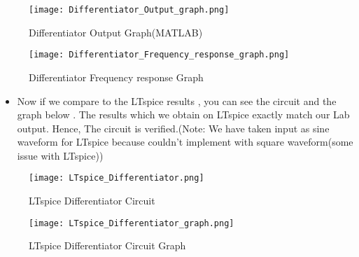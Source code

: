 \documentclass[9pt,conference]{IEEEtran}
\begin{document}
\begin{figure}[H]
    \centering
    \texttt{[image: Differentiator\_Output\_graph.png]}
    \caption{Differentiator Output Graph(MATLAB)}
    \label{fig:positive_clamper}
\end{figure}
\begin{figure}[H]
    \centering
    \texttt{[image: Differentiator\_Frequency\_response\_graph.png]}
    \caption{Differentiator Frequency response Graph}
    \label{fig:positive_clamper}
\end{figure}

\begin{itemize}
    \item Now if we compare to the LTspice results , you can see the circuit and the graph below . The results which we obtain on LTspice exactly match our Lab output. Hence, The circuit is verified.(Note: We have taken input as sine waveform for LTspice because couldn't implement with square waveform(some issue with LTspice))
\end{itemize}
\begin{figure}[H]
    \centering
    \texttt{[image: LTspice\_Differentiator.png]}
    \caption{LTspice Differentiator Circuit}
    \label{fig:positive_clamper}
\end{figure}
\begin{figure}[H]
    \centering
    \texttt{[image: LTspice\_Differentiator\_graph.png]}
    \caption{LTspice Differentiator Circuit Graph}
    \label{fig:positive_clamper}
\end{figure}
\end{document}
